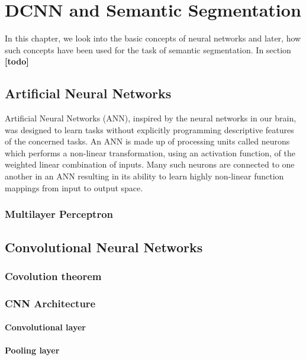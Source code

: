 
\chapter{DCNN and Semantic Segmentation}

	In this chapter, we look into the basic concepts of neural networks and later, how such concepts have been used for the task of semantic segmentation. In section  \textbf{[todo]}

\section{Artificial Neural Networks}

Artificial Neural Networks (ANN), inspired by the neural networks in our brain, was designed to learn tasks without explicitly programming descriptive features of the concerned tasks. An ANN is made up of processing units called neurons which performs a non-linear transformation, using an activation function, of the weighted linear combination of inputs.  Many such neurons are connected to one another in an ANN resulting in its ability to learn highly non-linear function mappings from input to output space. 


\subsection{Multilayer Perceptron}



\section{Convolutional Neural Networks}

\subsection{Covolution theorem}

\subsection{CNN Architecture}

\subsubsection{Convolutional layer}

\subsubsection{Pooling layer}

